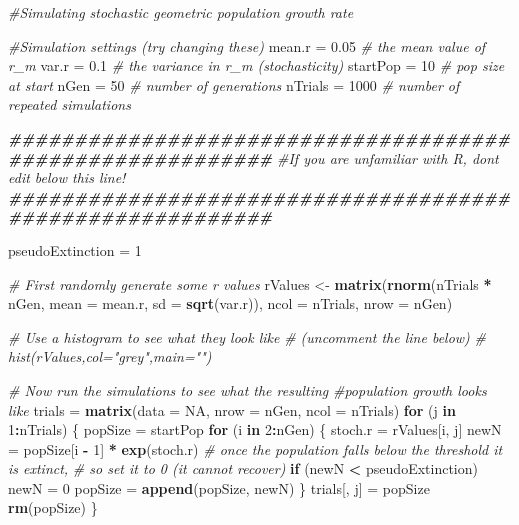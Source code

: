 \documentclass[
  a4paper]{book}
\newenvironment{Shaded}{\begin{snugshade}}{\end{snugshade}}
\newcommand{\AttributeTok}[1]{\textcolor[rgb]{0.13,0.29,0.53}{#1}}
\newcommand{\CommentTok}[1]{\textcolor[rgb]{0.56,0.35,0.01}{\textit{#1}}}
\newcommand{\ConstantTok}[1]{\textcolor[rgb]{0.56,0.35,0.01}{#1}}
\newcommand{\ControlFlowTok}[1]{\textcolor[rgb]{0.13,0.29,0.53}{\textbf{#1}}}
\newcommand{\DecValTok}[1]{\textcolor[rgb]{0.00,0.00,0.81}{#1}}
\newcommand{\DocumentationTok}[1]{\textcolor[rgb]{0.56,0.35,0.01}{\textbf{\textit{#1}}}}
\newcommand{\FloatTok}[1]{\textcolor[rgb]{0.00,0.00,0.81}{#1}}
\newcommand{\FunctionTok}[1]{\textcolor[rgb]{0.13,0.29,0.53}{\textbf{#1}}}
\newcommand{\NormalTok}[1]{#1}
\newcommand{\OtherTok}[1]{\textcolor[rgb]{0.56,0.35,0.01}{#1}}
\newcommand{\SpecialCharTok}[1]{\textcolor[rgb]{0.81,0.36,0.00}{\textbf{#1}}}
\begin{document}
\begin{Shaded}
\begin{Highlighting}[]
\CommentTok{\#Simulating stochastic geometric population growth rate}

\CommentTok{\#Simulation settings (try changing these)}
\NormalTok{mean.r }\OtherTok{=} \FloatTok{0.05} \CommentTok{\# the mean value of r\_m}
\NormalTok{var.r }\OtherTok{=} \FloatTok{0.1} \CommentTok{\# the variance in r\_m (stochasticity)}
\NormalTok{startPop }\OtherTok{=} \DecValTok{10} \CommentTok{\# pop size at start}
\NormalTok{nGen }\OtherTok{=} \DecValTok{50} \CommentTok{\# number of generations}
\NormalTok{nTrials }\OtherTok{=} \DecValTok{1000} \CommentTok{\# number of repeated simulations}

\DocumentationTok{\#\#\#\#\#\#\#\#\#\#\#\#\#\#\#\#\#\#\#\#\#\#\#\#\#\#\#\#\#\#\#\#\#\#\#\#\#\#\#\#\#\#\#\#\#\#\#\#\#\#\#\#\#\#\#\#\#\#}
\CommentTok{\#If you are unfamiliar with R, don\textquotesingle{}t edit below this line!}
\DocumentationTok{\#\#\#\#\#\#\#\#\#\#\#\#\#\#\#\#\#\#\#\#\#\#\#\#\#\#\#\#\#\#\#\#\#\#\#\#\#\#\#\#\#\#\#\#\#\#\#\#\#\#\#\#\#\#\#\#\#\#}

\NormalTok{pseudoExtinction }\OtherTok{=} \DecValTok{1}

\CommentTok{\# First randomly generate some r values}
\NormalTok{rValues }\OtherTok{\textless{}{-}} \FunctionTok{matrix}\NormalTok{(}\FunctionTok{rnorm}\NormalTok{(nTrials }\SpecialCharTok{*}\NormalTok{ nGen, }
                        \AttributeTok{mean =}\NormalTok{ mean.r, }
                        \AttributeTok{sd =} \FunctionTok{sqrt}\NormalTok{(var.r)),}
                  \AttributeTok{ncol =}\NormalTok{ nTrials,}
                  \AttributeTok{nrow =}\NormalTok{ nGen)}

\CommentTok{\# Use a histogram to see what they look like }
\CommentTok{\# (uncomment the line below)}
\CommentTok{\# hist(rValues,col="grey",main="")}

\CommentTok{\# Now run the simulations to see what the resulting }
\CommentTok{\#population growth looks like}
\NormalTok{trials }\OtherTok{=} \FunctionTok{matrix}\NormalTok{(}\AttributeTok{data =} \ConstantTok{NA}\NormalTok{, }\AttributeTok{nrow =}\NormalTok{ nGen, }\AttributeTok{ncol =}\NormalTok{ nTrials)}
\ControlFlowTok{for}\NormalTok{ (j }\ControlFlowTok{in} \DecValTok{1}\SpecialCharTok{:}\NormalTok{nTrials) \{}
\NormalTok{  popSize }\OtherTok{=}\NormalTok{ startPop}
  \ControlFlowTok{for}\NormalTok{ (i }\ControlFlowTok{in} \DecValTok{2}\SpecialCharTok{:}\NormalTok{nGen) \{}
\NormalTok{    stoch.r }\OtherTok{=}\NormalTok{ rValues[i, j]}
\NormalTok{    newN }\OtherTok{=}\NormalTok{ popSize[i }\SpecialCharTok{{-}} \DecValTok{1}\NormalTok{] }\SpecialCharTok{*} \FunctionTok{exp}\NormalTok{(stoch.r)}
    \CommentTok{\# once the population falls below the threshold it is extinct,}
    \CommentTok{\# so set it to 0 (it cannot recover)}
    \ControlFlowTok{if}\NormalTok{ (newN }\SpecialCharTok{\textless{}}\NormalTok{ pseudoExtinction) newN }\OtherTok{=} \DecValTok{0}
\NormalTok{    popSize }\OtherTok{=} \FunctionTok{append}\NormalTok{(popSize, newN)}
\NormalTok{  \}}
\NormalTok{  trials[, j] }\OtherTok{=}\NormalTok{ popSize}
  \FunctionTok{rm}\NormalTok{(popSize)}
\NormalTok{\}}


\end{Highlighting}
\end{Shaded}
\end{document}
